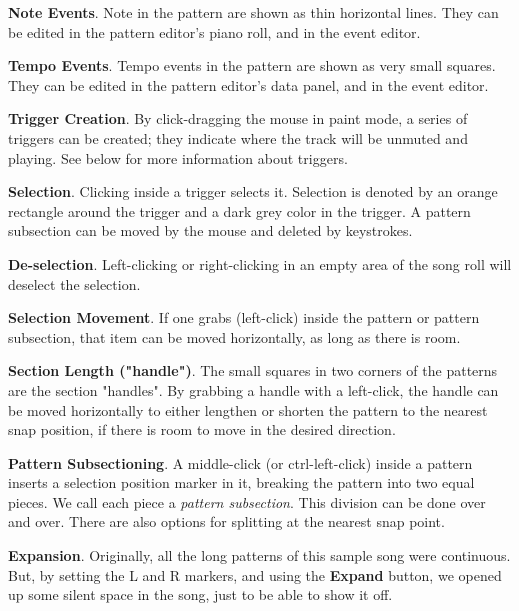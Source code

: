    \begin{enumber}
      \item \textbf{Note Events}.
         Note in the pattern are shown as thin horizontal lines.
         They can be edited in the pattern editor's piano roll,
         and in the event editor.
      \item \textbf{Tempo Events}.
         Tempo events in the pattern are shown as very small squares.
         They can be edited in the pattern editor's data panel,
         and in the event editor.
      \item \textbf{Trigger Creation}.
         By click-dragging the mouse in paint mode, a series of triggers can be
         created; they indicate where the track will be unmuted and playing.
         See below for more information about triggers.
      \item \textbf{Selection}.
         Clicking inside a trigger selects it.
         Selection is denoted by an orange rectangle around the trigger
         and a dark grey color in the trigger.
         A pattern subsection can be moved by the mouse and deleted by
         keystrokes.
      \item \textbf{De-selection}.
         Left-clicking or right-clicking in an empty area of the song roll
         will deselect the selection.
      \item \textbf{Selection Movement}.
         If one grabs (left-click) inside
         the pattern or pattern subsection, that item can be moved
         horizontally, as long as there is room.
      \item \textbf{Section Length ("handle")}.
         The small squares in two corners of the patterns are the section
         "handles".
         By grabbing a handle with a left-click, the handle can be moved
         horizontally to either lengthen or shorten the pattern to the nearest
         snap position, if there is room to move in the desired direction.
      \item \textbf{Pattern Subsectioning}.
         A middle-click (or ctrl-left-click)
         inside a pattern inserts a selection position
         marker in it, breaking the pattern into two equal pieces.
         We call each piece a \textsl{pattern subsection}.
         This division can be done over and over.
         There are also options for splitting at the nearest snap point.
      \item \textbf{Expansion}.
         Originally, all the long patterns of this sample song were continuous.
         But, by setting the L and R markers, and using the \textbf{Expand}
         button, we opened up some silent space in the song, just to be able
         to show it off.
   \end{enumber}

